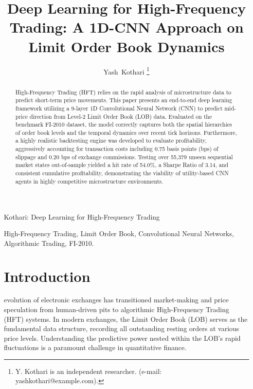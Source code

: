 \documentclass[journal]{IEEEtran}
\begin{document}
\title{Deep Learning for High-Frequency Trading: A 1D-CNN Approach on Limit Order Book Dynamics}

\author{Yash~Kothari%
\thanks{Y. Kothari is an independent researcher. (e-mail: yashkothari@example.com).}%
}

%
{Kothari: Deep Learning for High-Frequency Trading}

\maketitle

\begin{abstract}
High-Frequency Trading (HFT) relies on the rapid analysis of microstructure data to predict short-term price movements. This paper presents an end-to-end deep learning framework utilizing a 9-layer 1D Convolutional Neural Network (CNN) to predict mid-price direction from Level-2 Limit Order Book (LOB) data. Evaluated on the benchmark FI-2010 dataset, the model correctly captures both the spatial hierarchies of order book levels and the temporal dynamics over recent tick horizons. Furthermore, a highly realistic backtesting engine was developed to evaluate profitability, aggressively accounting for transaction costs including 0.75 basis points (bps) of slippage and 0.20 bps of exchange commissions. Testing over 55,379 unseen sequential market states out-of-sample yielded a hit rate of 54.0\%, a Sharpe Ratio of 3.14, and consistent cumulative profitability, demonstrating the viability of utility-based CNN agents in highly competitive microstructure environments.
\end{abstract}

\begin{IEEEkeywords}
High-Frequency Trading, Limit Order Book, Convolutional Neural Networks, Algorithmic Trading, FI-2010.
\end{IEEEkeywords}

\IEEEpeerreviewmaketitle

\section{Introduction}
 evolution of electronic exchanges has transitioned market-making and price speculation from human-driven pits to algorithmic High-Frequency Trading (HFT) systems. In modern exchanges, the Limit Order Book (LOB) serves as the fundamental data structure, recording all outstanding resting orders at various price levels. Understanding the predictive power nested within the LOB's rapid fluctuations is a paramount challenge in quantitative finance.
\end{document}
